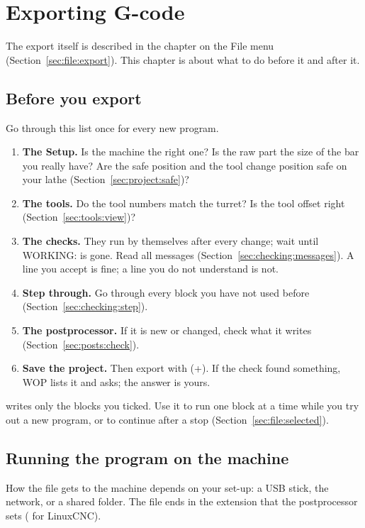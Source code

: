 \chapter{Exporting G-code}\label{ch:exporting}

The export itself is described in the chapter on the File menu (Section~\ref{sec:file:export}). This chapter is about what to do before it and after it.

\section{Before you export}
Go through this list once for every new program.
\begin{enumerate}
  \item \textbf{The Setup.} Is the machine the right one? Is the raw part the size of the bar you really have? Are the safe position and the tool change position safe on your lathe (Section~\ref{sec:project:safe})?
  \item \textbf{The tools.} Do the tool numbers match the turret? Is the tool offset right (Section~\ref{sec:tools:view})?
  \item \textbf{The checks.} They run by themselves after every change; wait until \textsf{WORKING:} is gone. Read all messages (Section~\ref{sec:checking:messages}). A line you accept is fine; a line you do not understand is not.
  \item \textbf{Step through.} Go through every block you have not used before (Section~\ref{sec:checking:step}).
  \item \textbf{The postprocessor.} If it is new or changed, check what it writes (Section~\ref{sec:posts:check}).
  \item \textbf{Save the project.} Then export with  (+). If the check found something, WOP lists it and asks; the answer is yours.
\end{enumerate}

\begin{notebox}
 writes only the blocks you ticked. Use it to run one block at a time while you try out a new program, or to continue after a stop (Section~\ref{sec:file:selected}).
\end{notebox}

\section{Running the program on the machine}
How the file gets to the machine depends on your set-up: a USB stick, the network, or a shared folder. The file ends in the extension that the postprocessor sets ( for LinuxCNC).

